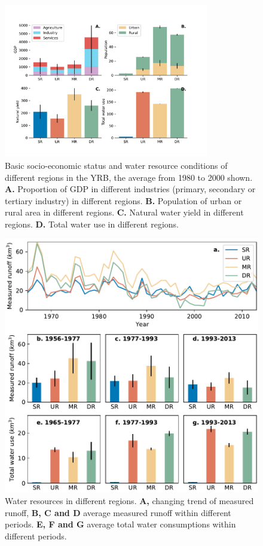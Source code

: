 \documentclass[9pt,twoside,lineno]{pnas-new}
\begin{document}
\begin{figure}
    \centering
    \includegraphics[width=0.8\textwidth]{../../figures/sup/region_differences.jpg}
    \caption{
        Basic socio-economic status and water resource conditions of different regions in the YRB, the average from 1980 to 2000 shown.
        \textbf{A.} Proportion of GDP in different industries (primary, secondary or tertiary industry) in different regions.
        \textbf{B.} Population of urban or rural area in different regions.
        \textbf{C.} Natural water yield in different regions.
        \textbf{D.} Total water use in different regions.
    }
\end{figure}


\begin{figure}
    \centering
    \includegraphics[width=\textwidth]{../../figures/sup/sf_measured_runoff.pdf}
    \caption{Water resources in different regions. 
        \textbf{A,} changing trend of measured runoff, 
        \textbf{B, C and D} average measured runoff within different periods.
        \textbf{E, F and G} average total water consumptions within different periods. 
    }
\end{figure}
\end{document}
